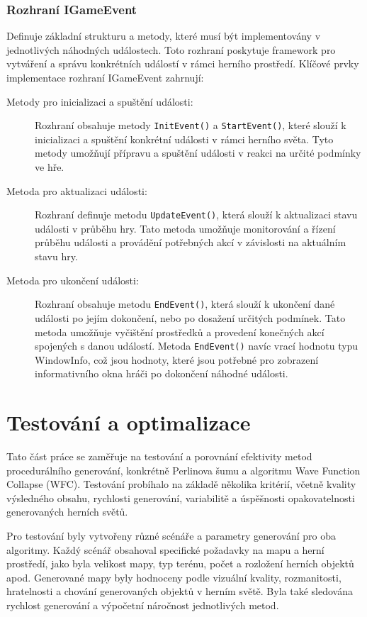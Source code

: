 \subsection{Rozhraní IGameEvent}
Definuje základní strukturu a metody, které musí být implementovány v jednotlivých náhodných událostech. Toto rozhraní poskytuje framework pro vytváření a správu konkrétních událostí v rámci herního prostředí. Klíčové prvky implementace rozhraní IGameEvent zahrnují:
\begin{description}
	\item[Metody pro inicializaci a spuštění události:] Rozhraní obsahuje metody \texttt{InitEvent()} a \texttt{StartEvent()}, které slouží k inicializaci a spuštění konkrétní události v rámci herního světa. Tyto metody umožňují přípravu a spuštění události v reakci na určité podmínky ve hře.
	\item[Metoda pro aktualizaci události:] Rozhraní definuje metodu \texttt{UpdateEvent()}, která slouží k aktualizaci stavu události v průběhu hry. Tato metoda umožňuje monitorování a řízení průběhu události a provádění potřebných akcí v závislosti na aktuálním stavu hry.
	\item[Metoda pro ukončení události:] Rozhraní obsahuje metodu \texttt{EndEvent()}, která slouží k ukončení dané události po jejím dokončení, nebo po dosažení určitých podmínek. Tato metoda umožňuje vyčištění prostředků a provedení konečných akcí spojených s danou událostí. Metoda \texttt{EndEvent()} navíc vrací hodnotu typu WindowInfo, což jsou hodnoty, které jsou potřebné pro zobrazení informativního okna hráči po dokončení náhodné události.
\end{description}

\chapter{Testování a optimalizace}
\label{experiments}
Tato část práce se zaměřuje na testování a porovnání efektivity metod procedurálního generování, konkrétně Perlinova šumu a algoritmu Wave Function Collapse (WFC). Testování probíhalo na základě několika kritérií, včetně kvality výsledného obsahu, rychlosti generování, variabilitě a úspěšnosti opakovatelnosti generovaných herních světů.

Pro testování byly vytvořeny různé scénáře a parametry generování pro oba algoritmy. Každý scénář obsahoval specifické požadavky na mapu a herní prostředí, jako byla velikost mapy, typ terénu, počet a rozložení herních objektů apod. Generované mapy byly hodnoceny podle vizuální kvality, rozmanitosti, hratelnosti a chování generovaných objektů v herním světě. Byla také sledována rychlost generování a výpočetní náročnost jednotlivých metod.

